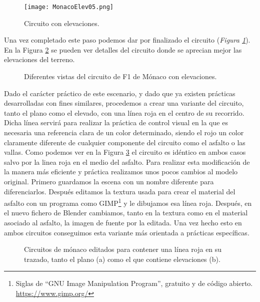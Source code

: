 \begin{figure}[hb]
	\centering
	\texttt{[image: MonacoElev05.png]}
	\caption{Circuito con elevaciones.} \label{fig:monacoelev05}
\end{figure}

Una vez completado este paso podemos dar por finalizado el circuito (\textit{Figura \ref{fig:monacoelev05}}). En la Figura \ref{fig:monacoelevvistas} se pueden ver detalles del circuito donde se aprecian mejor las elevaciones del terreno.

\begin{figure}[h]
	\centering
	\caption{Diferentes vistas del circuito de F1 de Mónaco con elevaciones.} \label{fig:monacoelevvistas}
\end{figure}

Dado el carácter práctico de este escenario, y dado que ya existen prácticas desarrolladas con fines similares, procedemos a crear una variante del circuito, tanto el plano como el elevado, con una línea roja en el centro de su recorrido. Dicha línea servirá para realizar la práctica de control visual en la que es necesaria una referencia clara de un color determinado, siendo el rojo un color claramente diferente de cualquier componente del circuito como el asfalto o las vallas. Como podemos ver en la Figura \ref{fig:monacolinea} el circuito es idéntico en ambos casos salvo por la linea roja en el medio del asfalto. Para realizar esta modificación de la manera más eficiente y práctica realizamos unos pocos cambios al modelo original. Primero guardamos la escena con un nombre diferente para diferenciarlos. Después editamos la textura usada para crear el material del asfalto con un programa como GIMP\footnote{Siglas de “GNU Image Manipulation Program”, gratuito y de código abierto. \url{https://www.gimp.org/}} y le dibujamos esa línea roja. Después, en el nuevo fichero de Blender cambiamos, tanto en la textura como en el material asociado al asfalto, la imagen de fuente por la editada. Una vez hecho esto en ambos circuitos conseguimos esta variante más orientada a prácticas específicas. 

\begin{figure}[]
	\centering
	\caption[Circuitos con una línea roja.]{Circuitos de mónaco editados para contener una línea roja en su trazado, tanto el plano (a) como el que contiene elevaciones (b).} \label{fig:monacolinea}
\end{figure}

